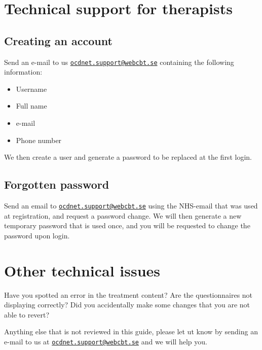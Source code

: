 \documentclass[]{book}
\providecommand{\tightlist}{%
  \setlength{\itemsep}{0pt}\setlength{\parskip}{0pt}}
\begin{document}
\hypertarget{technical-support-for-therapists}{%
\section{Technical support for therapists}\label{technical-support-for-therapists}}

\hypertarget{creating-an-account}{%
\subsection{Creating an account}\label{creating-an-account}}

Send an e-mail to us \href{mailto:ocdnet.support@webcbt.se}{\nolinkurl{ocdnet.support@webcbt.se}} containing the following information:

\begin{itemize}
\tightlist
\item
  Username
\item
  Full name
\item
  e-mail
\item
  Phone number
\end{itemize}

We then create a user and generate a password to be replaced at the first login.

\hypertarget{forgotten-password}{%
\subsection{Forgotten password}\label{forgotten-password}}

Send an email to \href{mailto:ocdnet.support@webcbt.se}{\nolinkurl{ocdnet.support@webcbt.se}} using the NHS-email that was used at registration, and request a password change. We will then generate a new temporary password that is used once, and you will be requested to change the password upon login.

\hypertarget{other-technical-issues}{%
\section{Other technical issues}\label{other-technical-issues}}

Have you spotted an error in the treatment content? Are the questionnaires not displaying correctly? Did you accidentally make some changes that you are not able to revert?

Anything else that is not reviewed in this guide, please let ut know by sending an e-mail to us at \href{mailto:ocdnet.support@webcbt.se}{\nolinkurl{ocdnet.support@webcbt.se}} and we will help you.
\end{document}
